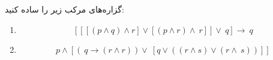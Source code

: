 \EXERCISE
گزاره‌های مرکب زیر را ساده کنید:
\begin{enumerate}
\item
$$[[[(p \wedge q) \wedge r] \vee [(p \wedge r) \wedge ~r]] \vee ~q] \rightarrow ~q$$
\item
$$p \wedge [(~q \rightarrow (r \wedge r)) \vee ~[q \vee ((r \wedge s) \vee (r \wedge ~s))]]$$
\end{enumerate}